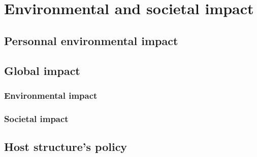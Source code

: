 \section{Environmental and societal impact}

\subsection{Personnal environmental impact}

\subsection{Global impact}

\subsubsection{Environmental impact}

\subsubsection{Societal impact}

\subsection{Host structure's policy}
